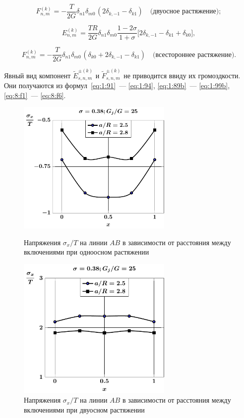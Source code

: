 \begin{equation*}
F_{n,m}^{(k)} =  -\frac{T}{2G}{\delta _{n1}}{\delta _{m0\,}}(2{\delta _{k, - 1}} - {\delta _{k1}})\quad\text{(двуосное растяжение)};
\label{eq:11:20}
\end{equation*}

\begin{equation*}
E_{n,m}^{(k)} =\frac{TR}{2G}\delta_{n1}\delta_{m0}\frac{1-2\sigma}{1+\sigma}\bigg[2\delta_{k,-1}-\delta_{k1}+\delta_{k0}\bigg],
\label{eq:11:21a}
\end{equation*}

\begin{equation*}
F_{n,m}^{(k)} =  -\frac{T}{2G}{\delta _{n1}}{\delta _{m0\,}}(\delta_{k0}+2{\delta _{k, - 1}} - {\delta _{k1}})\quad\text{(всестороннее растяжение)}.
\label{eq:11:21}
\end{equation*}

Явный вид компонент $\tilde E_{s,n,m}^{\pm(k)}$ и $\tilde F_{s,n,m}^{\pm(k)}$ не приводится ввиду их громоздкости. Они получаются из формул~\eqref{eq:1:91}~--- \eqref{eq:1:94}, \eqref{eq:1:89b}~--- \eqref{eq:1:99b}, \eqref{eq:8:f1}~--- \eqref{eq:8:f6}.

\begin{figure}[h!]
\centering\footnotesize
\parbox[b]{7.5cm}{\centering\includegraphics[width=7.5cm]{periodic-spheres-inc27-a-g25-t1-sig_x.pdf}
\caption{Напряжения $\sigma_x/T$ на линии $AB$ в зависимости от расстояния между включениями при одноосном растяжении
\label{f:11:12}}}\hfil\hfil
\parbox[b]{7.5cm}{\centering\includegraphics[width=7.5cm]{periodic-spheres-inc27-a-g25-t2-sig_x.pdf}
\caption{Напряжения $\sigma_x/T$ на линии $AB$ в зависимости от расстояния между включениями при двуосном растяжении
\label{f:11:13}}}
\end{figure}


